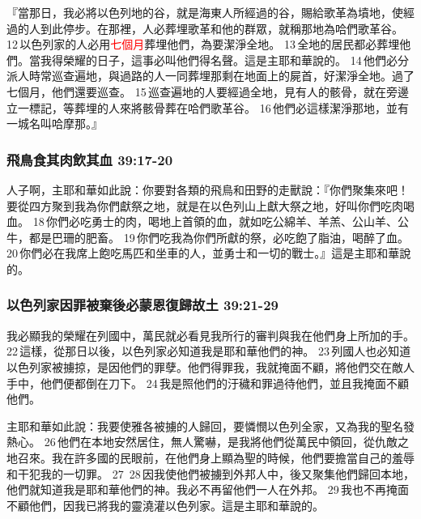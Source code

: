 『當那日，我必將以色列地的谷，就是海東人所經過的谷，賜給歌革為墳地，使經過的人到此停步。在那裡，人必葬埋歌革和他的群眾，就稱那地為哈們歌革谷。 12 以色列家的人必用\textcolor{red}{七個月}葬埋他們，為要潔淨全地。 13 全地的居民都必葬埋他們。當我得榮耀的日子，這事必叫他們得名聲。這是主耶和華說的。 14 他們必分派人時常巡查遍地，與過路的人一同葬埋那剩在地面上的屍首，好潔淨全地。過了七個月，他們還要巡查。 15 巡查遍地的人要經過全地，見有人的骸骨，就在旁邊立一標記，等葬埋的人來將骸骨葬在哈們歌革谷。 16 他們必這樣潔淨那地，並有一城名叫哈摩那。』

\subsubsection{飛鳥食其肉飲其血 39:17-20}
人子啊，主耶和華如此說：你要對各類的飛鳥和田野的走獸說：『你們聚集來吧！要從四方聚到我為你們獻祭之地，就是在以色列山上獻大祭之地，好叫你們吃肉喝血。 18 你們必吃勇士的肉，喝地上首領的血，就如吃公綿羊、羊羔、公山羊、公牛，都是巴珊的肥畜。 19 你們吃我為你們所獻的祭，必吃飽了脂油，喝醉了血。 20 你們必在我席上飽吃馬匹和坐車的人，並勇士和一切的戰士。』這是主耶和華說的。

\subsubsection{以色列家因罪被棄後必蒙恩復歸故土 39:21-29}
我必顯我的榮耀在列國中，萬民就必看見我所行的審判與我在他們身上所加的手。 22 這樣，從那日以後，以色列家必知道我是耶和華他們的神。 23 列國人也必知道以色列家被擄掠，是因他們的罪孽。他們得罪我，我就掩面不顧，將他們交在敵人手中，他們便都倒在刀下。 24 我是照他們的汙穢和罪過待他們，並且我掩面不顧他們。

主耶和華如此說：我要使雅各被擄的人歸回，要憐憫以色列全家，又為我的聖名發熱心。 26 他們在本地安然居住，無人驚嚇，是我將他們從萬民中領回，從仇敵之地召來。我在許多國的民眼前，在他們身上顯為聖的時候，他們要擔當自己的羞辱和干犯我的一切罪。 27  28 因我使他們被擄到外邦人中，後又聚集他們歸回本地，他們就知道我是耶和華他們的神。我必不再留他們一人在外邦。 29 我也不再掩面不顧他們，因我已將我的靈澆灌以色列家。這是主耶和華說的。

